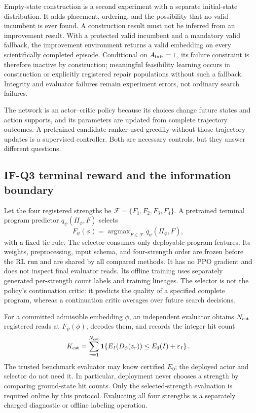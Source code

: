 \documentclass[11pt,a4paper]{article}
\theoremstyle{definition}\newtheorem{definition}[proposition]{Definition}
\begin{document}
Empty-state construction is a second experiment with a separate initial-state distribution. It adds
placement, ordering, and the possibility that no valid incumbent is ever found. A construction result
must not be inferred from an improvement result. With a protected valid incumbent and a mandatory
valid fallback, the improvement environment returns a valid embedding on every scientifically
completed episode. Conditional on $A_{\rm init}=1$, its failure constraint is therefore inactive by construction; meaningful
feasibility learning occurs in construction or explicitly registered repair populations without
such a fallback. Integrity and evaluator failures remain experiment errors, not ordinary search
failures.

The network is an actor--critic policy because its choices change future states and action supports,
and its parameters are updated from complete trajectory outcomes. A pretrained candidate ranker
used greedily without those trajectory updates is a supervised controller. Both are necessary
controls, but they answer different questions.

\subsection{IF-Q3 terminal reward and the information boundary}
\label{sec:rl-q3}

Let the four registered strengths be \(\mathcal F=\{F_1,F_2,F_3,F_4\}\). A pretrained terminal
program predictor \(q_\psi(\Pi_\phi,F)\) selects
\begin{equation}
 F_\psi(\phi)=\mathop{\arg\max}_{F\in\mathcal F}q_\psi(\Pi_\phi,F),
 \label{eq:rl-strength-selector}
\end{equation}
with a fixed tie rule. The selector consumes only deployable program features. Its weights,
preprocessing, input schema, and four-strength order are frozen before the RL run and are shared by
all compared methods. It has no PPO gradient and does not inspect final evaluator reads. Its offline
training uses separately generated per-strength count labels and training lineages. The selector is
not the policy's continuation critic: it predicts the quality of a specified complete program,
whereas a continuation critic averages over future search decisions.

For a committed admissible embedding \(\phi\), an independent evaluator obtains \(N_{\rm est}\)
registered reads at \(F_\psi(\phi)\), decodes them, and records the integer hit count
\begin{equation}
 K_{\rm est}=\sum_{r=1}^{N_{\rm est}}
 \mathbf 1\!\left\{E_I(D_\phi(z_r))\le E_0(I)+\varepsilon_I\right\}.
 \label{eq:rl-terminal-count}
\end{equation}
The trusted benchmark evaluator may know certified \(E_0\); the deployed actor and selector do not
need it. In particular, deployment never chooses a strength by comparing ground-state hit counts.
Only the selected-strength evaluation is required online by this protocol. Evaluating all four
strengths is a separately charged diagnostic or offline labeling operation.
\end{document}
